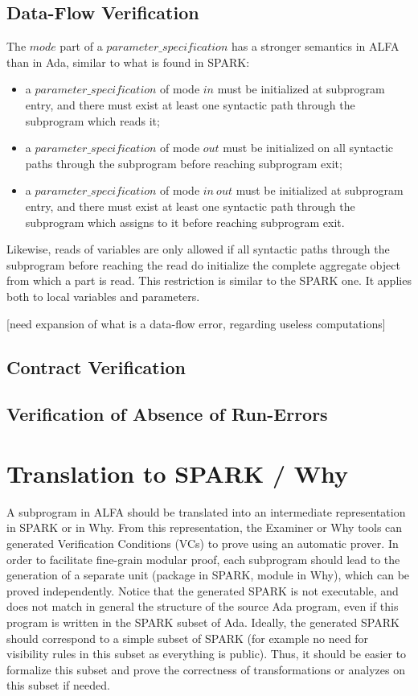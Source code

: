 \documentclass{article}
\newcommand{\bnf}[1]{$\mathit{#1}$}
\begin{document}
\subsection{Data-Flow Verification}

The \bnf{mode} part of a \bnf{parameter\_specification} has a stronger
semantics in ALFA than in Ada, similar to what is found in SPARK:
\begin{itemize}
\item a \bnf{parameter\_specification} of mode \bnf{in} must be initialized at
  subprogram entry, and there must exist at least one syntactic path through
  the subprogram which reads it;
\item a \bnf{parameter\_specification} of mode \bnf{out} must be initialized on
  all syntactic paths through the subprogram before reaching subprogram exit;
\item a \bnf{parameter\_specification} of mode \bnf{in\ out} must be initialized
  at subprogram entry, and there must exist at least one syntactic path through
  the subprogram which assigns to it before reaching subprogram exit.
\end{itemize}

Likewise, reads of variables are only allowed if all syntactic paths through
the subprogram before reaching the read do initialize the complete aggregate
object from which a part is read. This restriction is similar to the SPARK
one. It applies both to local variables and parameters.

[need expansion of what is a data-flow error, regarding useless computations]

\subsection{Contract Verification}

\subsection{Verification of Absence of Run-Errors}


\section{Translation to SPARK / Why}

A subprogram in ALFA should be translated into an intermediate representation
in SPARK or in Why. From this representation, the Examiner or Why tools can
generated Verification Conditions (VCs) to prove using an automatic prover.  In
order to facilitate fine-grain modular proof, each subprogram should lead to
the generation of a separate unit (package in SPARK, module in Why), which can
be proved independently. Notice that the generated SPARK is not executable, and
does not match in general the structure of the source Ada program, even if this
program is written in the SPARK subset of Ada. Ideally, the generated SPARK
should correspond to a simple subset of SPARK (for example no need for
visibility rules in this subset as everything is public). Thus, it should be
easier to formalize this subset and prove the correctness of transformations or
analyzes on this subset if needed.
\end{document}
